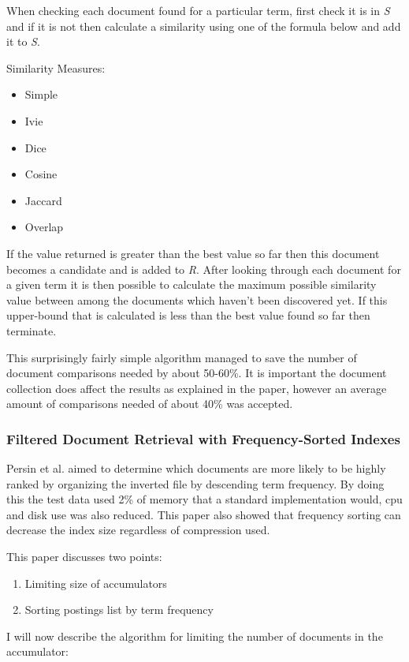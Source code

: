 \documentclass{acm_proc_article-sp}
\begin{document}
When checking each document found for a particular term, first check it is in \emph{S} and if it is not then calculate a similarity using one of the formula below and add it to \emph{S}.

Similarity Measures:
\begin{itemize}
\item Simple
\item Ivie
\item Dice
\item Cosine
\item Jaccard
\item Overlap
\end{itemize}

If the value returned is greater than the best value so far then this document becomes a candidate and is added to \emph{R}. After looking through each document for a given term it is then possible to calculate the maximum possible similarity value between among the documents which haven't been discovered yet. If this upper-bound that is calculated is less than the best value found so far then terminate.

This surprisingly fairly simple algorithm managed to save the number of document comparisons needed by about 50-60\%. It is important the document collection does affect the results as explained in the paper, however an average amount of comparisons needed of about 40\% was accepted.

\subsubsection{Filtered Document Retrieval with Frequency-Sorted Indexes}

Persin et al. \cite{Persin:1996} aimed to determine which documents are more likely to be highly ranked by organizing the inverted file by descending term frequency. By doing this the test data used 2\% of memory that a standard implementation would, cpu and disk use was also reduced. This paper also showed that frequency sorting can decrease the index size regardless of compression used.

This paper discusses two points:
\begin{enumerate}
\item Limiting size of accumulators
\item Sorting postings list by term frequency
\end{enumerate}
I will now describe the algorithm for limiting the number of documents in the accumulator:
\end{document}
